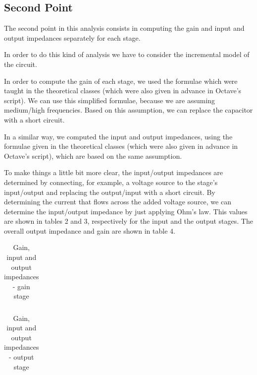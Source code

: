 \subsection{Second Point}

\par The second point in this analysis consists in computing the gain and input and output impedances separately for each stage.
\par In order to do this kind of analysis we have to consider the incremental model of the circuit.


\par In order to compute the gain of each stage, we used the formulae which were taught in the theoretical classes (which were also given in advance in Octave's script). We can use this simplified formulae, because we are assuming medium/high frequencies. Based on this assumption, we can replace the capacitor with a short circuit.
\par In a similar way, we computed the input and output impedances, using the formulae given in the theoretical classes (which were also given in advance in Octave's script), which are based on the same assumption.
\par To make things a little bit more clear, the input/output impedances are determined by connecting, for example, a voltage source to the stage's input/output and replacing the output/input with a short circuit. By determining the current that flows across the added voltage source, we can determine the input/output impedance by just applying Ohm's law. This values are shown in tables 2 and 3, respectively for the input and the output stages. The overall output impedance and gain are shown in table 4.

\vspace{5mm}
\begin{table}[H]
	\centering
	\begin{tabularx}{0.9\textwidth} {
 	    | >{\raggedright\arraybackslash}X
  	    | >{\raggedleft\arraybackslash}X | }
	\hline
	
	\end{tabularx}
	\caption{Gain, input and output impedances - gain stage}
	\label{tab:stage1}
\end{table}
\vspace{5mm}

\begin{table}[H]
	\centering
	\begin{tabularx}{0.9\textwidth} {
 	    | >{\raggedright\arraybackslash}X
  	    | >{\raggedleft\arraybackslash}X | }
	\hline
	
	\end{tabularx}
	\caption{Gain, input and output impedances - output stage}
	\label{tab:stage2}
\end{table}
\vspace{5mm}

